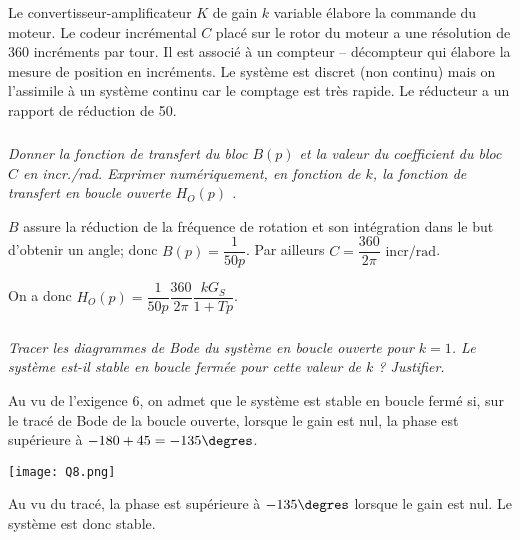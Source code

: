 \begin{multicols}{2}
Le convertisseur-amplificateur $K$ de gain $k$ variable élabore la commande du moteur.
Le codeur incrémental $C$ placé sur le rotor du moteur a une résolution de 360 incréments par tour. Il est associé à un compteur -- décompteur qui élabore la mesure de position en incréments. 
Le système est discret (non continu) mais on l’assimile à un système continu car le comptage est très rapide. 
Le réducteur a un rapport de réduction de 50.
 
\subparagraph{}\textit{Donner la fonction de transfert du bloc $B(p)$ et la valeur du coefficient du bloc $C$ en incr./rad.  
Exprimer numériquement, en fonction de $k$, la fonction de transfert en boucle ouverte $H_O(p)$ .}
\ifprof
\begin{corrige}
$B$ assure la réduction de la fréquence de rotation et son intégration dans le but d'obtenir un angle; donc $B(p)=\dfrac{1}{50p}$.
Par ailleurs $C=\dfrac{360}{2\pi}\text{ incr/rad} $. 

On a donc $H_O(p)=\dfrac{1}{50p}\dfrac{360}{2\pi} \dfrac{kG_S}{1+Tp}$.
\end{corrige}
\else
\fi


\subparagraph{}\textit{Tracer les diagrammes de Bode du système en boucle ouverte pour $k = 1$.
Le système est-il stable en boucle fermée pour cette valeur de $k$ ? Justifier.
} 
\begin{remarque}
Au vu de l'exigence 6, on admet que le système est stable en boucle fermé si, sur le tracé de Bode de la boucle ouverte, lorsque le gain est nul, la phase est supérieure à $-180+45=-135\degres$. 
\end{remarque}

\ifprof



\begin{center}
\texttt{[image: Q8.png]}
\end{center}
\begin{corrige}
Au vu du tracé, la phase est supérieure à $-135\degres$ lorsque le gain est nul. Le système est donc stable.
\end{corrige}
\else
\fi

% 


\end{multicols}
